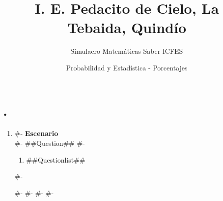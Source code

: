 \documentclass[a4paper,12pt]{article}
\title{I. E. Pedacito de Cielo, La Tebaida, Quindío}
\author{Simulacro Matemáticas Saber ICFES}
\date{Probabilidad y Estadística - Porcentajes}
\begin{document}
\maketitle

\section*{.}


\begin{enumerate}[label=\arabic*.]
#-
  \item
#-
  \textbf{Escenario}\\
#-
  ##Question##
#-
  \begin{enumerate}[label=(\alph*)]
    \item ##Questionlist##
  \end{enumerate}
#-

#-
#-
#-
#-
\end{enumerate}
\end{document}
